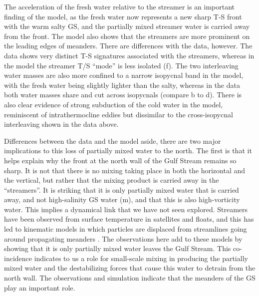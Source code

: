 \documentclass{natureJMK}
\begin{document}
The acceleration of the fresh water relative to the streamer is an important finding of the model, as the fresh water now represents a new sharp T-S front with the warm salty GS, and the partially mixed streamer water is carried away from the front.  The model also shows that the streamers are more prominent on the leading edges of meanders.  There are differences with the data, however.  The data shows very distinct T-S signatures associated with the streamers, whereas in the model the streamer T/S ``mode'' is less isolated (f).  The two interleaving water masses are also more confined to a narrow  isopycnal band in the model, with the fresh water being slightly lighter than the salty, whereas in the data both water masses  share and cut across isopycnals (compare b to d).   There is also clear evidence of strong subduction of the cold water in the model, reminiscent of intrathermocline eddies \cite{thomasjoyce10} but dissimilar to the cross-isopycnal interleaving shown in the data above.    

Differences between the data and the model aside, there are two major implications to this loss of partially mixed water to the north.  The first is that it helps explain why the front at the north wall of the Gulf Stream remains so sharp.  It is not that there is no mixing taking place in both the horizontal and the vertical, but rather that the mixing product is carried away in the ``streamers''.  It is striking that it is only partially mixed water that is carried away, and not high-salinity GS water (m), and that this is also high-vorticity water.  This implies a dynamical link that we have not seen explored.  Streamers have been observed from surface temperature in satellites and floats\cite{bowerrossby89,flierletal87,lozieretal97,songetal95}, and this has led to kinematic models in which particles are displaced from streamlines going around propagating meanders \cite{bower91,prattetal95,lozieretal97}. The observations here add to these models by showing that it is only partially mixed water leaves the Gulf Stream.  This co-incidence indicates to us a role for small-scale mixing in producing the partially mixed water and the destabilizing forces that cause this water to detrain from the north wall.  The observations and simulation indicate that the meanders of the GS play an important role.  
\end{document}
